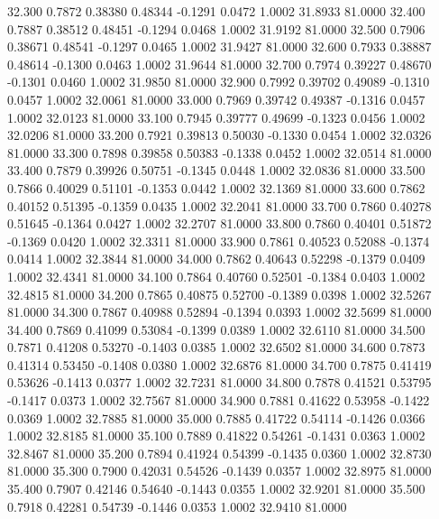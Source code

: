   32.300   0.7872   0.38380   0.48344  -0.1291   0.0472   1.0002  31.8933  81.0000
  32.400   0.7887   0.38512   0.48451  -0.1294   0.0468   1.0002  31.9192  81.0000
  32.500   0.7906   0.38671   0.48541  -0.1297   0.0465   1.0002  31.9427  81.0000
  32.600   0.7933   0.38887   0.48614  -0.1300   0.0463   1.0002  31.9644  81.0000
  32.700   0.7974   0.39227   0.48670  -0.1301   0.0460   1.0002  31.9850  81.0000
  32.900   0.7992   0.39702   0.49089  -0.1310   0.0457   1.0002  32.0061  81.0000
  33.000   0.7969   0.39742   0.49387  -0.1316   0.0457   1.0002  32.0123  81.0000
  33.100   0.7945   0.39777   0.49699  -0.1323   0.0456   1.0002  32.0206  81.0000
  33.200   0.7921   0.39813   0.50030  -0.1330   0.0454   1.0002  32.0326  81.0000
  33.300   0.7898   0.39858   0.50383  -0.1338   0.0452   1.0002  32.0514  81.0000
  33.400   0.7879   0.39926   0.50751  -0.1345   0.0448   1.0002  32.0836  81.0000
  33.500   0.7866   0.40029   0.51101  -0.1353   0.0442   1.0002  32.1369  81.0000
  33.600   0.7862   0.40152   0.51395  -0.1359   0.0435   1.0002  32.2041  81.0000
  33.700   0.7860   0.40278   0.51645  -0.1364   0.0427   1.0002  32.2707  81.0000
  33.800   0.7860   0.40401   0.51872  -0.1369   0.0420   1.0002  32.3311  81.0000
  33.900   0.7861   0.40523   0.52088  -0.1374   0.0414   1.0002  32.3844  81.0000
  34.000   0.7862   0.40643   0.52298  -0.1379   0.0409   1.0002  32.4341  81.0000
  34.100   0.7864   0.40760   0.52501  -0.1384   0.0403   1.0002  32.4815  81.0000
  34.200   0.7865   0.40875   0.52700  -0.1389   0.0398   1.0002  32.5267  81.0000
  34.300   0.7867   0.40988   0.52894  -0.1394   0.0393   1.0002  32.5699  81.0000
  34.400   0.7869   0.41099   0.53084  -0.1399   0.0389   1.0002  32.6110  81.0000
  34.500   0.7871   0.41208   0.53270  -0.1403   0.0385   1.0002  32.6502  81.0000
  34.600   0.7873   0.41314   0.53450  -0.1408   0.0380   1.0002  32.6876  81.0000
  34.700   0.7875   0.41419   0.53626  -0.1413   0.0377   1.0002  32.7231  81.0000
  34.800   0.7878   0.41521   0.53795  -0.1417   0.0373   1.0002  32.7567  81.0000
  34.900   0.7881   0.41622   0.53958  -0.1422   0.0369   1.0002  32.7885  81.0000
  35.000   0.7885   0.41722   0.54114  -0.1426   0.0366   1.0002  32.8185  81.0000
  35.100   0.7889   0.41822   0.54261  -0.1431   0.0363   1.0002  32.8467  81.0000
  35.200   0.7894   0.41924   0.54399  -0.1435   0.0360   1.0002  32.8730  81.0000
  35.300   0.7900   0.42031   0.54526  -0.1439   0.0357   1.0002  32.8975  81.0000
  35.400   0.7907   0.42146   0.54640  -0.1443   0.0355   1.0002  32.9201  81.0000
  35.500   0.7918   0.42281   0.54739  -0.1446   0.0353   1.0002  32.9410  81.0000
